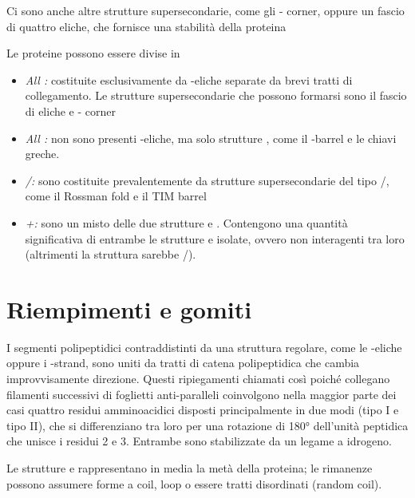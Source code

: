 
Ci sono anche altre strutture supersecondarie, come gli \alpha-\alpha{}
corner, oppure un fascio di quattro eliche, che fornisce una stabilità
della proteina

Le proteine possono essere divise in

\begin{itemize}
\item
\emph{All \alpha:} costituite esclusivamente da \alpha-eliche separate da
brevi tratti di collegamento. Le strutture supersecondarie che possono
formarsi sono il fascio di eliche e \alpha-\alpha{} corner
\item
\emph{All \beta:} non sono presenti \alpha-eliche, ma solo strutture \beta,
come il \beta-barrel e le chiavi greche.
\item
\emph{\alpha/\beta:} sono costituite prevalentemente da strutture
supersecondarie del tipo \alpha/\beta, come il Rossman fold e il TIM
barrel
\item
\emph{\alpha+\beta:} sono un misto delle due strutture \alpha{} e \beta{}.
Contengono una quantità significativa di entrambe le strutture
\alpha{} e \beta{} isolate, ovvero non interagenti tra loro
(altrimenti la struttura sarebbe \alpha/\beta).
\end{itemize}



\clearpage

\section{Riempimenti e gomiti}


I segmenti polipeptidici contraddistinti da una struttura regolare, come
le \alpha-eliche oppure i \beta-strand, sono uniti da tratti di catena
polipeptidica che cambia improvvisamente direzione. Questi ripiegamenti
\beta{} chiamati così poiché collegano filamenti successivi di foglietti
\beta{} anti-paralleli coinvolgono nella maggior parte dei casi quattro
residui amminoacidici disposti principalmente in due modi (tipo I e tipo
II), che si differenziano tra loro per una rotazione di 180° dell'unità
peptidica che unisce i residui 2 e 3. Entrambe sono stabilizzate da un
legame a idrogeno.

Le strutture \alpha{} e \beta{} rappresentano in media la metà della
proteina; le rimanenze possono assumere forme a coil, loop o essere
tratti disordinati (random coil).


